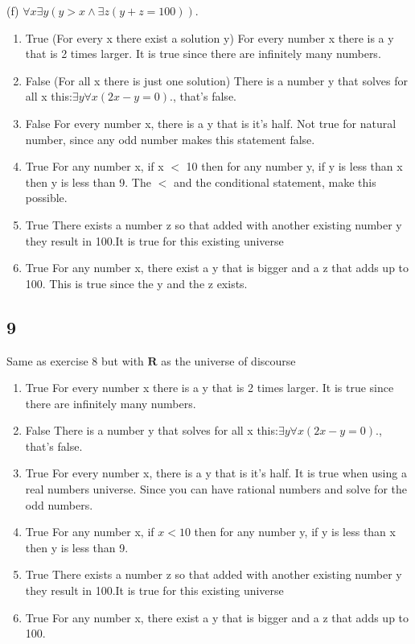 \documentclass{article}
\begin{document}
(f) $\forall x\exists y(y > x \land \exists z(y + z = 100)).$
\begin{enumerate}[label=(\alph*)]
    \item 
    True (For every x there exist a solution y) For every number x there is a y that is 2 times larger. It is true since there are infinitely many numbers.
    \item
    False (For all x there is just one solution) There is a number y that solves for all x this:$\exists y \forall x(2x - y = 0).$, that's false.
    \item
    False For every number x, there is a y that is it's half. Not true for natural number, since any odd number makes this statement false.
    \item
    True For any number x, if x $<$ 10 then for any number y, if y is less than x then y is less than 9. The $<$ and the conditional statement, make this possible.
    \item
    True There exists a number z so that added with another existing number y they result in 100.It is true for this existing universe 
    \item
    True For any number x, there exist a y that is bigger and a z that adds up to 100. This is true since the y and the z exists.
\end{enumerate}
\subsection{9}
Same as exercise 8 but with $\mathbf{R}$ as the universe of discourse
\begin{enumerate}[label=(\alph*)]
    \item 
    True For every number x there is a y that is 2 times larger. It is true since there are infinitely many numbers.
    \item
    False There is a number y that solves for all x this:$\exists y \forall x(2x - y = 0).$, that's false.
    \item
    True For every number x, there is a y that is it's half. It is true when using a real numbers universe. Since you can have rational numbers and solve for the odd numbers.
    \item
    True For any number x, if $x<10$ then for any number y, if y is less than x then y is less than 9.
    \item
    True There exists a number z so that added with another existing number y they result in 100.It is true for this existing universe 
    \item
    True  For any number x, there exist a y that is bigger and a z that adds up to 100.
\end{enumerate}
\end{document}
